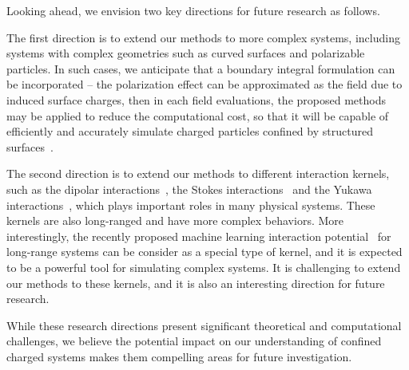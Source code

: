 Looking ahead, we envision two key directions for future research as follows.

The first direction is to extend our methods to more complex systems, including systems with complex geometries such as curved surfaces and polarizable particles.
In such cases, we anticipate that a boundary integral formulation can be incorporated -- the polarization effect can be approximated as the field due to induced surface charges, then in each field evaluations, the proposed methods may be applied to reduce the computational cost, so that it will be capable of efficiently and accurately simulate charged particles confined by structured surfaces~\cite{wu2018asymmetric}.

The second direction is to extend our methods to different interaction kernels, such as the dipolar interactions~\cite{Messina2017PRL}, the Stokes interactions~\cite{barnett2018unified} and the Yukawa interactions~\cite{Hou2009PRL}, which plays important roles in many physical systems.
These kernels are also long-ranged and have more complex behaviors.
More interestingly, the recently proposed machine learning interaction potential~\cite{cheng2025latent, ji2025machinelearninginteratomicpotentialslongrange} for long-range systems can be consider as a special type of kernel, and it is expected to be a powerful tool for simulating complex systems.
It is challenging to extend our methods to these kernels, and it is also an interesting direction for future research.

While these research directions present significant theoretical and computational challenges, we believe the potential impact on our understanding of confined charged systems makes them compelling areas for future investigation.